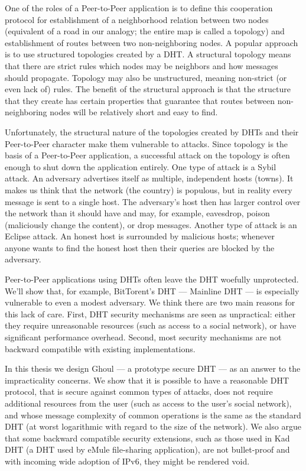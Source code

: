 One of the roles of a Peer-to-Peer application is to define this cooperation
protocol for establishment of a neighborhood relation between two nodes
(equivalent of a road in our analogy; the entire map is called a topology) and
establishment of routes between two non-neighboring nodes.
A popular approach is to use structured topologies created by a DHT.
A structural topology means that there are strict rules which nodes may be
neighbors and how messages should propagate.
Topology may also be unstructured, meaning non-strict (or even lack of) rules.
The benefit of the structural approach is that the structure that they create
has certain properties that guarantee that routes between non-neighboring nodes
will be relatively short and easy to find.

Unfortunately, the structural nature of the topologies created by DHTs and
their Peer-to-Peer character make them vulnerable to attacks.
Since topology is the basis of a Peer-to-Peer application, a successful attack
on the topology is often enough to shut down the application entirely.
One type of attack is a Sybil attack.
An adversary advertises itself as multiple, independent hosts (towns).
It makes us think that the network (the country) is populous, but in reality
every message is sent to a single host.
The adversary's host then has larger control over the network than it should
have and may, for example, eavesdrop, poison (maliciously change the content),
or drop messages.
Another type of attack is an Eclipse attack.
An honest host is surrounded by malicious hosts; whenever anyone wants to find
the honest host then their queries are blocked by the adversary.

Peer-to-Peer applications using DHTs often leave the DHT woefully unprotected.
We'll show that, for example, BitTorent's DHT --- Mainline DHT --- is especially
vulnerable to even a modest adversary.
We think there are two main reasons for this lack of care.
First, DHT security mechanisms are seen as unpractical: either they require
unreasonable resources (such as access to a social network), or have significant
performance overhead.
Second, most security mechanisms are not backward compatible with existing
implementations.

In this thesis we design Ghoul --- a prototype secure DHT ---
as an answer to the impracticality concerns.
We show that it is possible to have a reasonable DHT protocol, that is secure
against common types of attacks, does not require additional resources from the
user (such as access to the user's social network), and whose message complexity
of common operations is the same as the standard DHT (at worst logarithmic with
regard to the size of the network).
We also argue that some backward compatible security extensions, such as those
used in Kad DHT (a DHT used by eMule file-sharing application), are not
bullet-proof and with incoming wide adoption of IPv6, they might be rendered
void.

